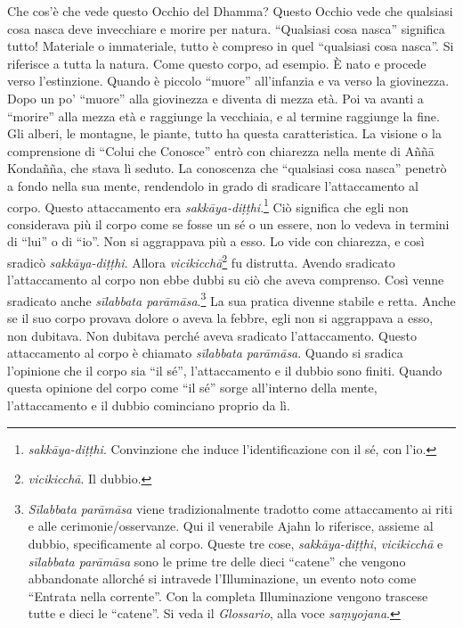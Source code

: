 Che cos'è che vede questo Occhio del Dhamma? Questo Occhio vede che
qualsiasi cosa nasca deve invecchiare e morire per natura. ``Qualsiasi
cosa nasca'' significa tutto! Materiale o immateriale, tutto è compreso
in quel ``qualsiasi cosa nasca''. Si riferisce a tutta la natura. Come
questo corpo, ad esempio. È nato e procede verso l'estinzione. Quando è
piccolo ``muore'' all'infanzia e va verso la giovinezza. Dopo un po'
``muore'' alla giovinezza e diventa di mezza età. Poi va avanti a
``morire'' alla mezza età e raggiunge la vecchiaia, e al termine
raggiunge la fine. Gli alberi, le montagne, le piante, tutto ha questa
caratteristica. La visione o la comprensione di ``Colui che Conosce''
entrò con chiarezza nella mente di Aññā Kondañña, che stava lì seduto.
La conoscenza che ``qualsiasi cosa nasca'' penetrò a fondo nella sua
mente, rendendolo in grado di sradicare l'attaccamento al corpo. Questo
attaccamento era \emph{sakkāya-diṭṭhi}.\footnote{\emph{sakkāya-diṭṭhi}.
  Convinzione che induce l'identificazione con il sé, con l'io.} Ciò
significa che egli non considerava più il corpo come se fosse un sé o un
essere, non lo vedeva in termini di ``lui'' o di ``io''. Non si
aggrappava più a esso. Lo vide con chiarezza, e così sradicò
\emph{sakkāya-diṭṭhi}. Allora \emph{vicikicchā}\footnote{\emph{vicikicchā}.
  Il dubbio.} fu distrutta. Avendo sradicato l'attaccamento al corpo non
ebbe dubbi su ciò che aveva comprenso. Così venne sradicato anche
\emph{sīlabbata parāmāsa}.\footnote{\emph{Sīlabbata parāmāsa} viene
  tradizionalmente tradotto come attaccamento ai riti e alle
  cerimonie/osservanze. Qui il venerabile Ajahn lo riferisce, assieme al
  dubbio, specificamente al corpo. Queste tre cose,
  \emph{sakkāya-diṭṭhi}, \emph{vicikicchā} e \emph{sīlabbata parāmāsa}
  sono le prime tre delle dieci ``catene'' che vengono abbandonate
  allorché si intravede l'Illuminazione, un evento noto come ``Entrata
  nella corrente''. Con la completa Illuminazione vengono trascese tutte
  e dieci le ``catene''. Si veda il \emph{Glossario}, alla voce
  \emph{saṃyojana}.} La sua pratica divenne stabile e retta. Anche se il
suo corpo provava dolore o aveva la febbre, egli non si aggrappava a
esso, non dubitava. Non dubitava perché aveva sradicato l'attaccamento.
Questo attaccamento al corpo è chiamato \emph{sīlabbata parāmāsa}.
Quando si sradica l'opinione che il corpo sia ``il sé'', l'attaccamento
e il dubbio sono finiti. Quando questa opinione del corpo come ``il sé''
sorge all'interno della mente, l'attaccamento e il dubbio cominciano
proprio da lì.

